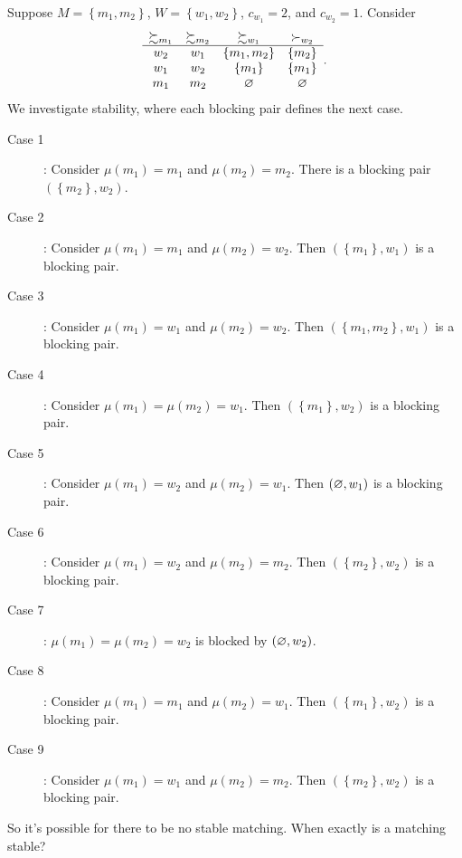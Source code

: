\begin{example}
	Suppose $M = \left\{m_1,m_2\right\}$, $W = \left\{w_1,w_2\right\}$, $c_{w_1} = 2$, and $c_{w_2} = 1$.
	Consider \[
		\begin{array}{cccc}
			\succsim_{m_1} & \succsim_{m_2} & \succsim_{w_1} & \succ_{w_2} \\
				\hline
			w_2 & w_1 & \left\{m_1,m_2\right\} & \left\{m_2\right\} \\
			w_1 & w_2 & \left\{m_1\right\} & \left\{m_1\right\} \\
			m_1 & m_2 & \varnothing &\varnothing
		\end{array}
	.\]
	We investigate stability, where each blocking pair defines the next case.
	\begin{description}
		\item[Case 1]: Consider $\mu(m_1) =m_1$ and $\mu(m_2) = m_2$. There is a blocking pair $\left( \left\{m_2\right\},w_2 \right)$.
		\item[Case 2]: Consider $\mu(m_1) = m_1$ and $\mu(m_2) = w_2$. Then $\left( \left\{m_1\right\},w_1 \right)$ is a blocking pair.
		\item[Case 3]: Consider $\mu(m_1) = w_1$ and $\mu(m_2) = w_2$. Then $\left( \left\{m_1,m_2\right\},w_1 \right)$ is a blocking pair.
		\item[Case 4]: Consider $\mu(m_1) = \mu(m_2) = w_1$. Then $(\left\{m_1\right\}, w_2)$ is a blocking pair.
		\item[Case 5]: Consider $\mu(m_1) = w_2$ and $\mu(m_2) = w_1$. Then $\left( \varnothing, w_1 \right)$ is a blocking pair.
		\item[Case 6]: Consider $\mu(m_1) = w_2$ and $\mu(m_2) = m_2$. Then $\left( \left\{m_2\right\}, w_2 \right)$ is a blocking pair.
		\item[Case 7]: $\mu(m_1) = \mu(m_2) = w_2$ is blocked by $\left( \varnothing, w_2 \right)$.
		\item[Case 8]: Consider $\mu(m_1) = m_1$ and $\mu(m_2) = w_1$. Then $\left( \left\{m_1\right\}, w_2 \right)$ is a blocking pair.
		\item[Case 9]: Consider $\mu(m_1) = w_1$ and $\mu(m_2) = m_2$. Then $\left( \left\{m_2\right\}, w_2 \right)$ is a blocking pair.
	\end{description}
\end{example}
So it's possible for there to be no stable matching.
When exactly is a matching stable?

